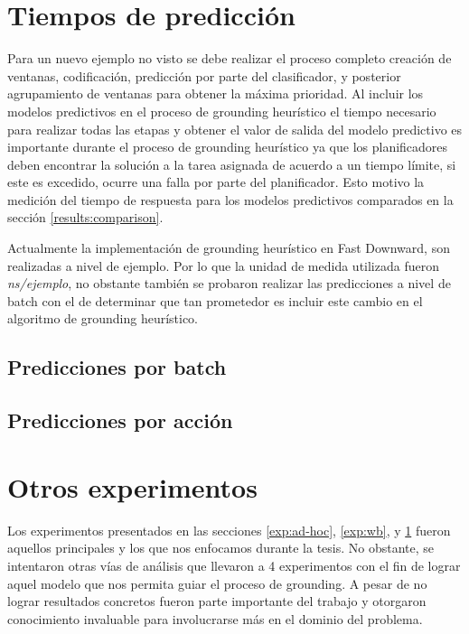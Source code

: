 \section{Tiempos de predicción}
\label{exp:time}

Para un nuevo ejemplo no visto se debe realizar el proceso completo creación de ventanas, codificación, predicción por parte del clasificador, y posterior agrupamiento de ventanas para obtener la máxima prioridad. Al incluir los modelos predictivos en el proceso de grounding heurístico el tiempo necesario para realizar todas las etapas y obtener el valor de salida del modelo predictivo es importante durante el proceso de grounding heurístico ya que los planificadores deben encontrar la solución a la tarea asignada de acuerdo a un tiempo límite, si este es excedido, ocurre una falla por parte del planificador. Esto motivo la medición del tiempo de respuesta para los modelos predictivos comparados en la sección \ref{results:comparison}.

Actualmente la implementación de grounding heurístico en Fast Downward, son realizadas a nivel de ejemplo. Por lo que la unidad de medida utilizada fueron \emph{ns/ejemplo}, no obstante también se probaron realizar las predicciones a nivel de batch con el de determinar que tan prometedor es incluir este cambio en el algoritmo de grounding heurístico.

\subsection{Predicciones por batch}

\subsection{Predicciones por acción}

\section{Otros experimentos}

Los experimentos presentados en las secciones \ref{exp:ad-hoc}, \ref{exp:wb}, y \ref{exp:time} fueron aquellos principales y los que nos enfocamos durante la tesis. No obstante, se intentaron otras vías de análisis que llevaron a 4 experimentos con el fin de lograr aquel modelo que nos permita guiar el proceso de grounding. A pesar de no lograr resultados concretos fueron parte importante del trabajo y otorgaron conocimiento invaluable para involucrarse más en el dominio del problema.

